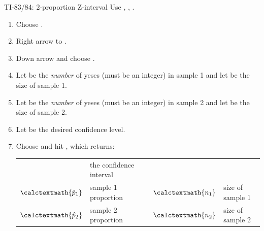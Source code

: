 \begin{onebox}{ TI-83/84: 2-proportion Z-interval}
Use , , .
\begin{enumerate}
\setlength{\itemsep}{0mm}
\item Choose .
\item Right arrow to .
\item Down arrow and choose .
\item Let  be the \emph{number} of yeses (must be an integer) in sample 1 and let  be the size of sample 1.
\item Let  be the \emph{number} of yeses (must be an integer) in sample 2 and let  be the size of sample 2.
\item Let  be the desired confidence level.
\item Choose  and hit , which returns: \\
\begin{tabular}{ll l ll}
\calctext{(\underline{\ \ },\underline{\ \ })} & the confidence interval \\
$\calctextmath{\hat{p}_1}$ & sample 1 proportion &\quad&
	$\calctextmath{n_1}$ & size of sample 1 \\
$\calctextmath{\hat{p}_2}$ & sample 2 proportion &&
	$\calctextmath{n_2}$ &  size of sample 2
\end{tabular}
\end{enumerate}
\end{onebox}

